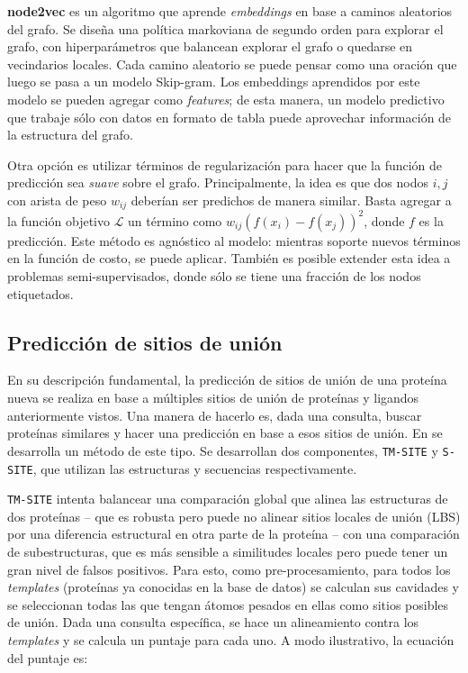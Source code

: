 \documentclass[
    left=2.0cm,         %
    right=2.0cm,        %
    top=2.0cm,          %
    bottom=2.5cm,         %
    bindingoffset=6mm,  %
    nohyphenation=false %
]{eiti/eiti-thesis}
\begin{document}
\textbf{node2vec} \cite{grover2016node2vec} es un algoritmo que aprende \textit{embeddings}
en base a caminos aleatorios del grafo. Se diseña una política markoviana de segundo orden
para explorar el grafo, con hiperparámetros que balancean explorar el grafo o quedarse en
vecindarios locales. Cada camino aleatorio se puede pensar como una oración que luego se
pasa a un modelo Skip-gram. Los embeddings aprendidos por este modelo se pueden agregar
como \textit{features}; de esta manera, un modelo predictivo que trabaje sólo con datos
en formato de tabla puede aprovechar información de la estructura del grafo.

Otra opción es utilizar términos de regularización para hacer que la función de predicción
sea \textit{suave} sobre el grafo\cite{seeingstars_regularization}. Principalmente, la idea
es que dos nodos $i,j$ con arista de peso $w_{ij}$ deberían ser predichos de manera similar.
Basta agregar a la función objetivo $\mathcal{L}$ un término como $w_{ij} (f(x_i)-f(x_j))^2$,
donde $f$ es la predicción. Este método es agnóstico al modelo: mientras soporte nuevos términos
en la función de costo, se puede aplicar. También es posible extender esta idea a problemas
semi-supervisados, donde sólo se tiene una fracción de los nodos etiquetados.

\subsection{Predicción de sitios de unión}

En su descripción fundamental, la predicción de sitios de unión de una proteína
nueva se realiza en base a múltiples sitios de unión de proteínas y ligandos
anteriormente vistos. Una manera de hacerlo es, dada una consulta, buscar
proteínas similares y hacer una predicción en base a esos sitios de unión. En 
\cite{yang2013tmsite} se desarrolla un método de este tipo. Se desarrollan dos
componentes, \texttt{TM-SITE} y \texttt{S-SITE}, que utilizan las estructuras
y secuencias respectivamente.

\texttt{TM-SITE} intenta balancear una comparación global que alinea las estructuras
de dos proteínas -- que es robusta pero puede no alinear sitios locales de unión (LBS)
por una diferencia estructural en otra parte de la proteína -- con una comparación de subestructuras,
que es más sensible a similitudes locales pero puede tener un gran nivel de falsos positivos. 
Para esto, como pre-procesamiento, para todos los \textit{templates} (proteínas ya conocidas
en la base de datos) se calculan sus cavidades y se seleccionan todas las que tengan
átomos pesados en ellas como sitios posibles de unión. Dada una consulta específica, se
hace un alineamiento contra los \textit{templates} y se calcula un puntaje para cada uno. A
modo ilustrativo, la ecuación del puntaje es:
\end{document}
